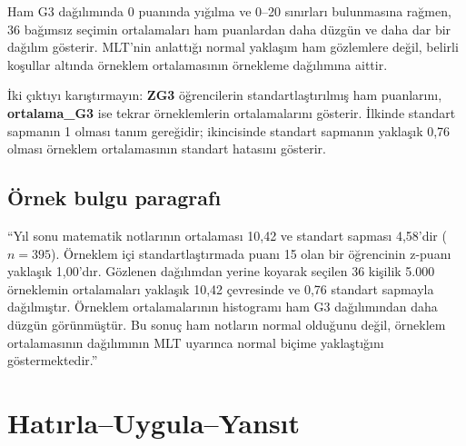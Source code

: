Ham G3 dağılımında 0 puanında yığılma ve 0--20 sınırları bulunmasına rağmen,
36 bağımsız seçimin ortalamaları ham puanlardan daha düzgün ve daha dar bir
dağılım gösterir. MLT'nin anlattığı normal yaklaşım ham gözlemlere değil,
belirli koşullar altında örneklem ortalamasının örnekleme dağılımına aittir.

\begin{outputguidebox}
İki çıktıyı karıştırmayın: \textbf{ZG3} öğrencilerin standartlaştırılmış ham
puanlarını, \textbf{ortalama\_G3} ise tekrar örneklemlerin ortalamalarını
gösterir. İlkinde standart sapmanın 1 olması tanım gereğidir; ikincisinde
standart sapmanın yaklaşık 0,76 olması örneklem ortalamasının standart
hatasını gösterir.
\end{outputguidebox}

\subsection{Örnek bulgu paragrafı}

``Yıl sonu matematik notlarının ortalaması 10,42 ve standart sapması 4,58'dir
($n=395$). Örneklem içi standartlaştırmada puanı 15 olan bir öğrencinin
z-puanı yaklaşık 1,00'dır. Gözlenen dağılımdan yerine koyarak seçilen 36
kişilik 5.000 örneklemin ortalamaları yaklaşık 10,42 çevresinde ve 0,76
standart sapmayla dağılmıştır. Örneklem ortalamalarının histogramı ham G3
dağılımından daha düzgün görünmüştür. Bu sonuç ham notların normal olduğunu
değil, örneklem ortalamasının dağılımının MLT uyarınca normal biçime
yaklaştığını göstermektedir.''





\section*{Hatırla--Uygula--Yansıt}


